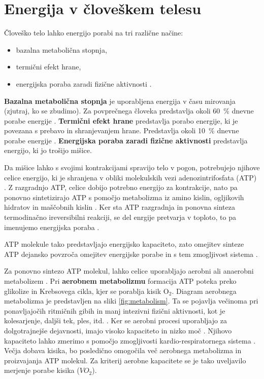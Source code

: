 \section{Energija v človeškem telesu}\label{sec:energija}
Človeško telo lahko energijo porabi na tri različne načine:

\begin{itemize}
\item bazalna metabolična stopnja,
\item termični efekt hrane,
\item energijska poraba zaradi fizične aktivnosti \cite{levine2005measurement}.
\end{itemize}

\textbf{Bazalna metabolična stopnja} je uporabljena energija v času mirovanja (zjutraj, ko se zbudimo). Za povprečnega človeka predstavlja okoli \SI{60}{\%} dnevne porabe energije \cite{levine2005measurement}. \textbf{Termični efekt hrane} predstavlja porabo energije, ki je povezana s prebavo in shranjevanjem hrane. Predstavlja okoli \SI{10}{\%} dnevne porabe energije \cite{levine2005measurement}. \textbf{Energijska poraba zaradi fizične aktivnosti} predstavlja energijo, ki jo trošijo mišice. 

Da mišice lahko s svojimi kontrakcijami spravijo telo v pogon, potrebujejo njihove celice energijo, ki je shranjena v obliki molekulskih vezi adenozintrifosfata (ATP) \cite{scott2005misconceptions}. Z razgradnjo ATP, celice dobijo potrebno energijo za kontrakcije, nato pa ponovno sintetizirajo ATP s pomočjo metabolizma iz amino kislin, ogljikovih hidratov in maščobnih kislin \cite{scott2005misconceptions,patel2017aerobic}. Ker sta ATP razgradnja in ponovna sinteza termodinačno ireversibilni reakciji, se del enrgije pretvarja v toploto, to pa imenujemo energijska poraba \cite{scott2005misconceptions}. 

ATP molekule tako predstavljajo energijsko kapaciteto, zato omejitev sinteze ATP dejansko povzroča omejitev energijske porabe in s tem zmogljivost sistema \cite{sahlin1998energy}. 

Za ponovno sintezo ATP molekul, lahko celice uporabljajo aerobni ali anaerobni metabolizem \cite{scott2005misconceptions}. Pri \textbf{aerobnem metabolizmu} formacija ATP poteka preko glikolize in Krebsovega cikla, kjer se porablja kisik $\mathrm{O}_2$. Diagram aerobnega metabolizma je predstavljen na sliki \ref{fig:metabolism}. Ta se pojavlja večinoma pri ponavljajočih ritmičnih gibih in manj intezivni fizični aktivnosti, kot je kolesarjenje, daljši tek, ples, itd. \cite{patel2017aerobic}. Ker se aerobni procesi uporabljajo za dolgotrajnejše dejavnosti, imajo visoko kapaciteto in nizko moč \cite{sahlin1998energy}. Njihovo kapaciteto lahko zmerimo s pomočjo zmogljivosti kardio-respiratornega sistema \cite{patel2017aerobic}. Večja dobava kisika, bo posledično omogočila več aerobnega metabolizma in proizvajanja ATP molekul. Za kriterij aerobne kapacitete se je tako uveljavilo merjenje porabe kisika (${VO}_2$).

